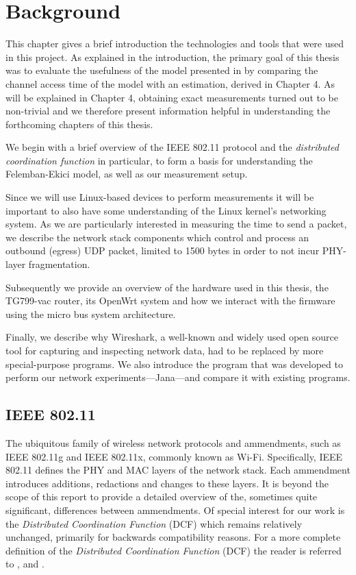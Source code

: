 
\chapter{Background}

This chapter gives a brief introduction the technologies and tools that were
used in this project. As explained in the introduction, the primary goal of
this thesis was to evaluate the usefulness of the model presented in
\cite{felemban} by comparing the channel access time of the model with an
estimation, derived in Chapter 4. As will be explained in Chapter 4, obtaining
exact measurements turned out to be non-trivial and we therefore present
information helpful in understanding the forthcoming chapters of this thesis.

We begin with a brief overview of the IEEE 802.11 protocol and the
\emph{distributed coordination function} in particular, to form a basis for
understanding the Felemban-Ekici model, as well as our measurement setup.

Since we will use Linux-based devices to perform measurements it will be
important to also have some understanding of the Linux kernel's networking
system. As we are particularly interested in measuring the time to send a
packet, we describe the network stack components which control and process an
outbound (egress) UDP packet, limited to 1500 bytes in order to not incur
PHY-layer fragmentation.

Subsequently we provide an overview of the hardware used in this thesis, the
TG799-vac router, its OpenWrt system and how we interact with the firmware
using the micro bus system architecture.

Finally, we describe why Wireshark, a well-known and widely used open source
tool for capturing and inspecting network data, had to be replaced by more
special-purpose programs. We also introduce the program that was developed to
perform our network experiments—Jana—and compare it with existing programs.

\section{IEEE 802.11}

The ubiquitous family of wireless network protocols and ammendments, such as
IEEE 802.11g and IEEE 802.11x, commonly known as Wi-Fi. Specifically, IEEE
802.11 defines the PHY and MAC layers of the network stack. Each ammendment
introduces additions, redactions and changes to these layers. It is beyond the
scope of this report to provide a detailed overview of the, sometimes quite
significant, differences between ammendments. Of special interest for our work
is the \emph{Distributed Coordination Function} (DCF) which remains relatively
unchanged, primarily for backwards compatibility reasons. For a more complete
definition of the \emph{Distributed Coordination Function} (DCF) the reader is
referred to \cite{654749}, \cite{5307322} and \cite{6687187}.

